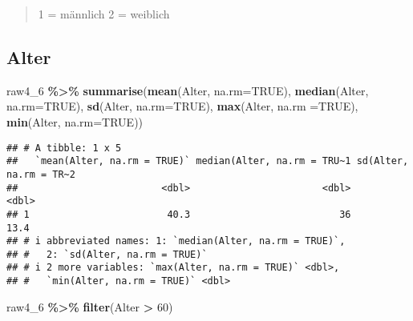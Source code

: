 \documentclass[
]{article}
\newenvironment{Shaded}{\begin{snugshade}}{\end{snugshade}}
\newcommand{\AttributeTok}[1]{\textcolor[rgb]{0.13,0.29,0.53}{#1}}
\newcommand{\ConstantTok}[1]{\textcolor[rgb]{0.56,0.35,0.01}{#1}}
\newcommand{\DecValTok}[1]{\textcolor[rgb]{0.00,0.00,0.81}{#1}}
\newcommand{\FunctionTok}[1]{\textcolor[rgb]{0.13,0.29,0.53}{\textbf{#1}}}
\newcommand{\NormalTok}[1]{#1}
\newcommand{\SpecialCharTok}[1]{\textcolor[rgb]{0.81,0.36,0.00}{\textbf{#1}}}
\begin{document}
\begin{quote}
1 = männlich 2 = weiblich
\end{quote}

\subsection{Alter}\label{alter}

\begin{Shaded}
\begin{Highlighting}[]
\NormalTok{raw4\_6 }\SpecialCharTok{\%\textgreater{}\%} 
  \FunctionTok{summarise}\NormalTok{(}\FunctionTok{mean}\NormalTok{(Alter, }\AttributeTok{na.rm=}\ConstantTok{TRUE}\NormalTok{),}
            \FunctionTok{median}\NormalTok{(Alter, }\AttributeTok{na.rm=}\ConstantTok{TRUE}\NormalTok{),}
         \FunctionTok{sd}\NormalTok{(Alter, }\AttributeTok{na.rm=}\ConstantTok{TRUE}\NormalTok{), }
         \FunctionTok{max}\NormalTok{(Alter, }\AttributeTok{na.rm =}\ConstantTok{TRUE}\NormalTok{),}
         \FunctionTok{min}\NormalTok{(Alter, }\AttributeTok{na.rm=}\ConstantTok{TRUE}\NormalTok{))}
\end{Highlighting}
\end{Shaded}

\begin{verbatim}
## # A tibble: 1 x 5
##   `mean(Alter, na.rm = TRUE)` median(Alter, na.rm = TRU~1 sd(Alter, na.rm = TR~2
##                         <dbl>                       <dbl>                  <dbl>
## 1                        40.3                          36                   13.4
## # i abbreviated names: 1: `median(Alter, na.rm = TRUE)`,
## #   2: `sd(Alter, na.rm = TRUE)`
## # i 2 more variables: `max(Alter, na.rm = TRUE)` <dbl>,
## #   `min(Alter, na.rm = TRUE)` <dbl>
\end{verbatim}

\begin{Shaded}
\begin{Highlighting}[]
\NormalTok{raw4\_6 }\SpecialCharTok{\%\textgreater{}\%} 
  \FunctionTok{filter}\NormalTok{(Alter }\SpecialCharTok{\textgreater{}} \DecValTok{60}\NormalTok{)}
\end{Highlighting}
\end{Shaded}
\end{document}
